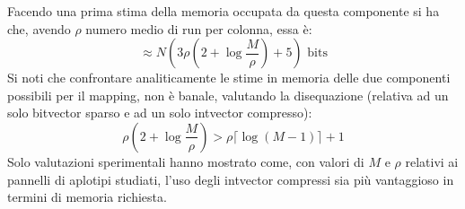 Facendo una prima stima della memoria occupata da questa componente si ha che,
avendo $\rho$ numero medio di run per colonna, essa è:
\begin{equation}
  \label{eq:mapbvmem}
  \approx N\left(3\rho\left(2+\log\frac{M}{\rho}\right)+5\right)\mbox{ bits}
\end{equation}
Si noti che confrontare analiticamente le stime in memoria delle due componenti
possibili per il mapping, non è banale, valutando la
disequazione (relativa ad un solo bitvector sparso e ad un solo intvector
compresso): 
\begin{equation}
  \label{eq:mapbvintmem}
  \rho\left(2+\log\frac{M}{\rho}\right)>\rho\lceil\log(M-1)\rceil+1
\end{equation}
Solo valutazioni sperimentali hanno mostrato come, con valori di $M$ e $\rho$
relativi ai pannelli di aplotipi studiati, l'uso degli intvector compressi sia
più vantaggioso in termini di memoria richiesta.

